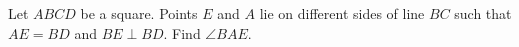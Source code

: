 Let $ABCD$ be a square. Points $E$ and $A$ lie on different sides of line $BC$ such that $AE=BD$ and $BE \perp BD$. Find $\angle BAE$.
